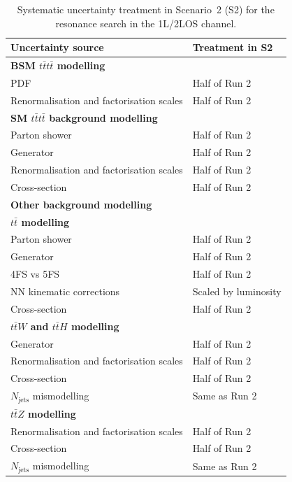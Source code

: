 \begin{table}[htbp]
\centering
\caption{Systematic uncertainty treatment in Scenario~2 (S2) for the resonance search in the 1L/2LOS channel.}
\label{tab:HL_syst_1L}

\begin{tabular}{p{} p{}}
\toprule
\textbf{Uncertainty source} & \textbf{Treatment in S2} \\
\midrule

\multicolumn{2}{l}{\textbf{\boldmath BSM $t\bar{t}t\bar{t}$ modelling}} \\
PDF & Half of Run 2 \\
Renormalisation and factorisation scales & Half of Run 2 \\
\midrule

\multicolumn{2}{l}{\textbf{\boldmath SM $t\bar{t}t\bar{t}$ background modelling}} \\
Parton shower & Half of Run 2 \\
Generator & Half of Run 2 \\
Renormalisation and factorisation scales & Half of Run 2 \\
Cross-section & Half of Run 2 \\
\midrule

\multicolumn{2}{l}{\textbf{Other background modelling}} \\

\multicolumn{2}{l}{\textbf{\boldmath $t\bar{t}$ modelling}} \\
Parton shower & Half of Run 2 \\
Generator & Half of Run 2 \\
4FS vs 5FS & Half of Run 2 \\
NN kinematic corrections & Scaled by luminosity \\
Cross-section & Half of Run 2 \\

\multicolumn{2}{l}{\textbf{\boldmath $t\bar{t}W$ and $t\bar{t}H$ modelling}} \\
Generator & Half of Run 2 \\
Renormalisation and factorisation scales & Half of Run 2 \\
Cross-section & Half of Run 2 \\
$N_{\mathrm{jets}}$ mismodelling & Same as Run 2 \\

\multicolumn{2}{l}{\textbf{\boldmath $t\bar{t}Z$ modelling}} \\
Renormalisation and factorisation scales & Half of Run 2 \\
Cross-section & Half of Run 2 \\
$N_{\mathrm{jets}}$ mismodelling & Same as Run 2 \\


\end{tabular}
\end{table}
